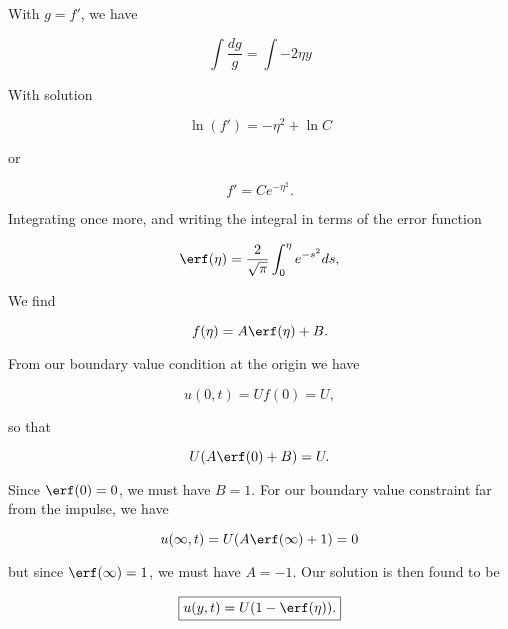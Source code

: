 With $g = f'$, we have

\begin{equation}\label{eqn:continuumL16:650}
\int \frac{dg}{g} = \int -2 \eta y
\end{equation}

With solution

\begin{equation}\label{eqn:continuumL16:670}
\ln(f') = - \eta^2 + \ln C
\end{equation}

or

\begin{equation}\label{eqn:continuumL16:690}
f' = C e^{- \eta^2}.
\end{equation}

Integrating once more, and writing the integral in terms of the error function

\begin{equation}\label{eqn:continuumL16:530}
\erf(\eta) = \frac{2}{\sqrt{\pi}} \int_0^\eta e^{-s^2} ds,
\end{equation}

We find

\begin{equation}\label{eqn:continuumL16:510}
f(\eta) = A \erf(\eta) + B.
\end{equation}

From our boundary value condition at the origin we have

\begin{equation}\label{eqn:continuumL16:710}
u(0, t) = U f(0) = U,
\end{equation}

so that

\begin{equation}\label{eqn:continuumL16:730}
U( A \erf(0) + B) = U.
\end{equation}

Since $\erf(0) = 0$, we must have $B = 1$.  For our boundary value constraint far from the impulse, we have

\begin{equation}\label{eqn:continuumL16:750}
u(\infty, t) = U( A \erf(\infty) + 1) = 0
\end{equation}

but since $\erf(\infty) = 1$, we must have $A = -1$.  Our solution is then found to be

\begin{equation}\label{eqn:continuumL16:590}
\boxed{
u(y, t) = U(1 - \erf(\eta)).
}
\end{equation}

